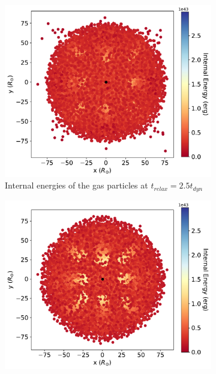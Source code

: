 \begin{figure}
    \centering    
    \begin{subfigure}[b]{0.495\textwidth}
        \centering
        \includegraphics[width=\textwidth]{Thesis/graphs/tertiary_internal_energy_relaxed_2_5_tdyn.pdf}
        \caption[]%
        {{\small Internal energies of the gas particles at  $t_{relax} = 2.5t_{dyn}$}}
    \end{subfigure}
    \hfill
    \begin{subfigure}[b]{0.495\textwidth}  
        \centering 
        \includegraphics[width=\textwidth]{Thesis/graphs/tertiary_internal_energy_relaxed_5_tdyn.pdf}

\end{subfigure}
\end{figure}
